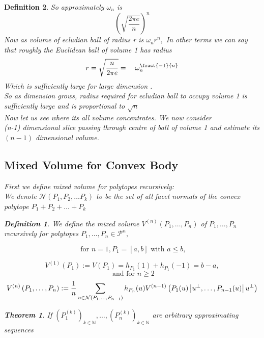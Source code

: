 \documentclass[oneside]{book}
\newtheorem{theorem}{Theorem}[section]
\newtheorem{mydef}{Definition}
\begin{document}
\begin{mydef}
So  approximately $\omega_{n}$ is 
$$\left(\sqrt{\frac{2 \pi e}{n}}\right)^{n}$$
Now as volume of ecludian ball of radius r is $\omega_{n} r^{n}, $
In other terms we can say that roughly the Euclidean ball of volume 1 has radius 
\[
r =  \sqrt{\frac{n}{2 \pi e}}   = \quad \omega_{n}^{\fract{-1}{n}}
\]
Which is sufficiently large for large dimension
. \\
So as dimension grows, radius required  for ecludian ball to occupy volume 1 is sufficiently large and is
 proportional to $\sqrt{n}$ \\
Now let us  see where its  all volume concentrates.
We now consider \\ (n-1) dimensional slice passing through centre of ball of volume 1 and estimate its $( n-1 )$  dimensional volume.
 






\subsection{Mixed Volume for Convex Body}
\label{ss:20}
First we define mixed volume for polytopes recursively:  \\
We denote  $ \mathcal{N}(P_{1},P_{2},\ldots P_{k})$ to be the set of all facet normals of the convex polytope $P_{1}+P_{2}+ \ldots + P_{k}$
\begin{mydef} \label{d:18}
We define the mixed volume $V^{(n)}\left(P_{1}, \ldots, P_{n}\right)$ of $P_{1}, \ldots, P_{n}$ recursively for polytopes $P_{1}, \ldots, P_{n} \in \mathcal{P}^{n},$ 
 
$$ \text{ for } n = 1, P_{1}=[a, b] \text { with } a \leq b,$$ 
    
  \begin{equation}
  \label{eq49}
      V^{(1)}\left(P_{1}\right):=V\left(P_{1}\right)=h_{P_{1}}(1)+h_{P_{1}}(-1) = b - a,  
  \end{equation} 
$$\text{ and} \text { for } n \geq 2 $$ 
\begin{equation} \label{eq50}
\\
V^{(n)}\left(P_{1}, \ldots, P_{n}\right):=\frac{1}{n} \sum_{u \in \mathcal{N}\left(P_{1}, \ldots, P_{n-1}\right)} h_{P_{n}}(u) V^{(n-1)}\left(P_{1}(u)\left|u^{\perp}, \ldots, P_{n-1}(u)\right| u^{\perp}\right)
\end{equation}
  \end{mydef}     
 \begin{theorem}
 \label{t:10}
  If $\left(P_{1}^{(k)}\right)_{k \in \mathbb{N}}, \ldots,\left(P_{n}^{(k)}\right)_{k \in \mathbb{N}}$ are arbitrary approximating sequences\\
  

\end{theorem}
\end{mydef}
\end{document}

